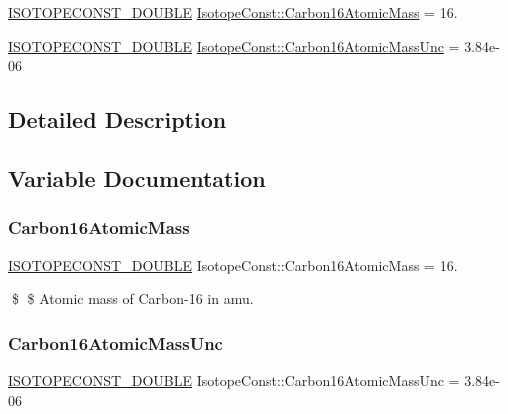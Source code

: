 \begin{DoxyCompactItemize}
\item 
\mbox{\hyperlink{group___isotope_const-_macros_ga8f45a7272ce02c0b4c65c44636ed719a}{I\+S\+O\+T\+O\+P\+E\+C\+O\+N\+S\+T\+\_\+\+D\+O\+U\+B\+LE}} \mbox{\hyperlink{group___isotope_const-_carbon-_c16_ga3373171347c8ace329462bf41d0107be}{Isotope\+Const\+::\+Carbon16\+Atomic\+Mass}} = 16.
\item 
\mbox{\hyperlink{group___isotope_const-_macros_ga8f45a7272ce02c0b4c65c44636ed719a}{I\+S\+O\+T\+O\+P\+E\+C\+O\+N\+S\+T\+\_\+\+D\+O\+U\+B\+LE}} \mbox{\hyperlink{group___isotope_const-_carbon-_c16_ga613ebf9e5289181472ef1266f8d78cf4}{Isotope\+Const\+::\+Carbon16\+Atomic\+Mass\+Unc}} = 3.\+84e-\/06
\end{DoxyCompactItemize}


\subsection{Detailed Description}


\subsection{Variable Documentation}
\mbox{\label{group___isotope_const-_carbon-_c16_ga3373171347c8ace329462bf41d0107be}} 
\subsubsection{\texorpdfstring{Carbon16\+Atomic\+Mass}{Carbon16AtomicMass}}
{\footnotesize\ttfamily \mbox{\hyperlink{group___isotope_const-_macros_ga8f45a7272ce02c0b4c65c44636ed719a}{I\+S\+O\+T\+O\+P\+E\+C\+O\+N\+S\+T\+\_\+\+D\+O\+U\+B\+LE}} Isotope\+Const\+::\+Carbon16\+Atomic\+Mass = 16.}

\$ \$ Atomic mass of Carbon-\/16 in amu. \mbox{\label{group___isotope_const-_carbon-_c16_ga613ebf9e5289181472ef1266f8d78cf4}} 
\subsubsection{\texorpdfstring{Carbon16\+Atomic\+Mass\+Unc}{Carbon16AtomicMassUnc}}
{\footnotesize\ttfamily \mbox{\hyperlink{group___isotope_const-_macros_ga8f45a7272ce02c0b4c65c44636ed719a}{I\+S\+O\+T\+O\+P\+E\+C\+O\+N\+S\+T\+\_\+\+D\+O\+U\+B\+LE}} Isotope\+Const\+::\+Carbon16\+Atomic\+Mass\+Unc = 3.\+84e-\/06}

